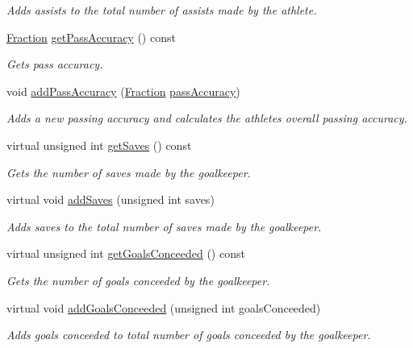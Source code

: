 \begin{DoxyCompactItemize}
\begin{DoxyCompactList}\small\item\em Adds assists to the total number of assists made by the athlete. \end{DoxyCompactList}\item 
\hyperlink{class_fraction}{Fraction} \hyperlink{class_info_a8891b7452e20bac9e90f3501d39bdec8}{get\+Pass\+Accuracy} () const
\begin{DoxyCompactList}\small\item\em Gets pass accuracy. \end{DoxyCompactList}\item 
void \hyperlink{class_info_a6a37e09fc6160b19f3f7b480f77393dd}{add\+Pass\+Accuracy} (\hyperlink{class_fraction}{Fraction} \hyperlink{class_info_a37ee53dc8ae9a9656206e7eb389c6392}{pass\+Accuracy})
\begin{DoxyCompactList}\small\item\em Adds a new passing accuracy and calculates the athlete\textquotesingle{}s overall passing accuracy. \end{DoxyCompactList}\item 
virtual unsigned int \hyperlink{class_info_a2d7c53d322a705aaeb08fb79f9ef5211}{get\+Saves} () const
\begin{DoxyCompactList}\small\item\em Gets the number of saves made by the goalkeeper. \end{DoxyCompactList}\item 
virtual void \hyperlink{class_info_a7e66fc93d6ab97827bbf50fa61c71186}{add\+Saves} (unsigned int saves)
\begin{DoxyCompactList}\small\item\em Adds saves to the total number of saves made by the goalkeeper. \end{DoxyCompactList}\item 
virtual unsigned int \hyperlink{class_info_a41d954fad291a5ffdfe29cb1cf3f75ce}{get\+Goals\+Conceeded} () const
\begin{DoxyCompactList}\small\item\em Gets the number of goals conceeded by the goalkeeper. \end{DoxyCompactList}\item 
virtual void \hyperlink{class_info_ae252f25a8dff58017b92ba7a5ad02bc0}{add\+Goals\+Conceeded} (unsigned int goals\+Conceeded)
\begin{DoxyCompactList}\small\item\em Adds goals conceeded to total number of goals conceeded by the goalkeeper. \end{DoxyCompactList}\item 

\end{DoxyCompactItemize}
